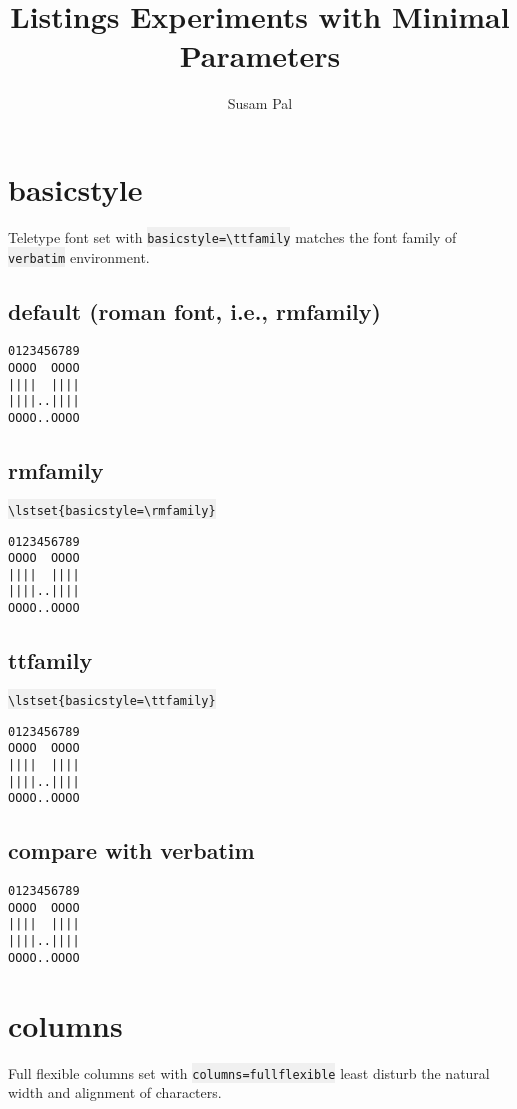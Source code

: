 \documentclass{article}
\title{Listings Experiments with Minimal Parameters}
\author{Susam Pal}
\newcommand{\bs}{\textbackslash}
\newcommand{\ttt}[1]{\colorbox[HTML]{f0f0f0}{\texttt{#1}}}
\begin{document}
\maketitle
\tableofcontents
\pagebreak

\section{basicstyle}
Teletype font set with \ttt{basicstyle=\bs{}ttfamily}
matches the font family of \ttt{verbatim} environment.

\subsection{default (roman font, i.e., rmfamily)}

{
\begin{lstlisting}
0123456789
OOOO  OOOO
||||  ||||
||||..||||
OOOO..OOOO
\end{lstlisting}
}

\subsection{rmfamily}
\ttt{\bs{}lstset\{basicstyle=\bs{}rmfamily\}}

{
\lstset{basicstyle=\rmfamily}
\begin{lstlisting}
0123456789
OOOO  OOOO
||||  ||||
||||..||||
OOOO..OOOO
\end{lstlisting}
}

\subsection{ttfamily}
\ttt{\bs{}lstset\{basicstyle=\bs{}ttfamily\}}

{
\lstset{basicstyle=\ttfamily}
\begin{lstlisting}
0123456789
OOOO  OOOO
||||  ||||
||||..||||
OOOO..OOOO
\end{lstlisting}
}

\subsection{compare with verbatim}
\begin{verbatim}
0123456789
OOOO  OOOO
||||  ||||
||||..||||
OOOO..OOOO
\end{verbatim}

\pagebreak


\section{columns}
Full flexible columns set with \ttt{columns=fullflexible} least disturb
the natural width and alignment of characters.
\end{document}
